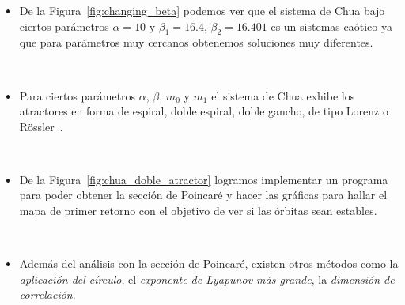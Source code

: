 \begin{frame}
	\frametitle{\secname}
	\begin{itemize}
		\item De la Figura~\ref{fig:changing_beta} podemos ver que el
		      sistema de Chua bajo ciertos parámetros $\alpha=10$  y
		      $\beta_{1}=16.4$, $\beta_{2}=16.401$ es un sistemas caótico
		      ya que para parámetros muy cercanos obtenemos soluciones
		      muy diferentes.

		      \

		\item Para ciertos parámetros $\alpha$, $\beta$, $m_{0}$ y $m_{1}$
		      el sistema de Chua exhibe los atractores en forma de
		      espiral, doble espiral, doble gancho, de tipo Lorenz o
		      Rössler~\parencite{271147}.

		      \


		\item De la Figura~\ref{fig:chua_doble_atractor} logramos implementar un programa para poder obtener la sección de Poincaré y hacer las gráficas para hallar el mapa de primer retorno con el objetivo de ver si las órbitas sean estables.


		      \

		\item Además del análisis con la sección de Poincaré, existen otros métodos como la \emph{aplicación del círculo},
		      el \emph{exponente de Lyapunov más grande}, la \emph{dimensión de correlación}.
	\end{itemize}
\end{frame}
